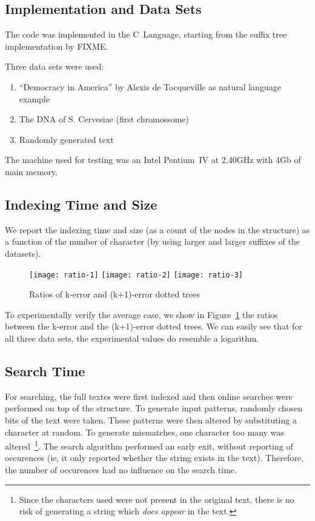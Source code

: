 \subsection{Implementation and Data Sets}

The code was implemented in the C~Language, starting from the suffix tree implementation by FIXME.

Three data sets were used:

\begin{enumerate}
\item ``Democracy in America'' by Alexis de Tocqueville as natural language example
\item The DNA of S. Cervesiae (first chromossome)
\item Randomly generated text
\end{enumerate}

The machine used for testing was an Intel Pentium~IV at 2.40GHz with 4Gb of main memory.

\subsection{Indexing Time and Size}

We report the indexing time and size (as a count of the nodes in the structure) as a function of the number of character (by using larger and larger suffixes of the datasets).

\begin{figure}%
\texttt{[image: ratio-1]}%
\texttt{[image: ratio-2]}%
\texttt{[image: ratio-3]}%
\caption{Ratios of k-error and (k+1)-error dotted trees}\label{fig:ratios}%
\end{figure}

To experimentally verify the average case, we show in Figure~\ref{fig:ratios} the ratios between the k-error and the (k+1)-error dotted trees. We can easily see that for all three data sets, the experimental values do resemble a logarithm.

\subsection{Search Time}

For searching, the full textes were first indexed and then online searches were performed on top of the structure. To generate input patterns, randomly chosen bits of the text were taken. These patterns were then altered by substituting a character at random. To generate mismatches, one character too many was altered~\footnote{Since the characters used were not present in the original text, there is no risk of generating a string which \emph{does appear} in the text.}. The search algorithm performed an early exit, without reporting of occurences (ie, it only reported whether the string exists in the text). Therefore, the number of occurences had no influence on the search time.

